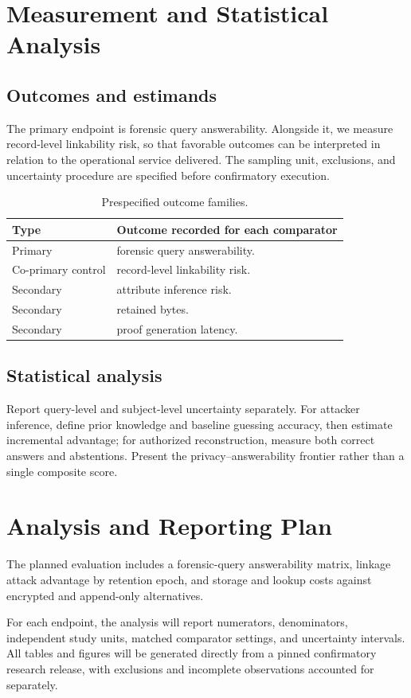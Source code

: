\documentclass[11pt,a4paper]{article}
\begin{document}
\section{Measurement and Statistical Analysis}
\subsection{Outcomes and estimands}
The primary endpoint is forensic query answerability. Alongside it, we measure record-level linkability risk, so that favorable outcomes can be interpreted in relation to the operational service delivered. The sampling unit, exclusions, and uncertainty procedure are specified before confirmatory execution.
\begin{table}[ht]
\centering\footnotesize
\caption{Prespecified outcome families.}
\begin{tabularx}{\linewidth}{@{}lX@{}}\toprule
Type & Outcome recorded for each comparator \\ \midrule
Primary & forensic query answerability. \\ 
Co-primary control & record-level linkability risk. \\ 
Secondary & attribute inference risk. \\ 
Secondary & retained bytes. \\ 
Secondary & proof generation latency. \\ 
\bottomrule\end{tabularx}
\end{table}

\subsection{Statistical analysis}
Report query-level and subject-level uncertainty separately. For attacker inference, define prior knowledge and baseline guessing accuracy, then estimate incremental advantage; for authorized reconstruction, measure both correct answers and abstentions. Present the privacy–answerability frontier rather than a single composite score.

\section{Analysis and Reporting Plan}
The planned evaluation includes a forensic-query answerability matrix, linkage attack advantage by retention epoch, and storage and lookup costs against encrypted and append-only alternatives.

For each endpoint, the analysis will report numerators, denominators, independent study units, matched comparator settings, and uncertainty intervals. All tables and figures will be generated directly from a pinned confirmatory research release, with exclusions and incomplete observations accounted for separately.
\end{document}
